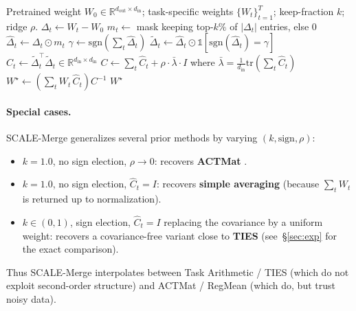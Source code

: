\documentclass{article} %
\begin{document}
\begin{algorithm}[t]
\caption{SCALE-Merge (per linear weight)}
\label{alg:scale}
\begin{algorithmic}[1]
\Require Pretrained weight $W_0 \in \mathbb{R}^{d_\text{out}\times d_\text{in}}$; task-specific weights $\{W_t\}_{t=1}^T$; keep-fraction $k$; ridge $\rho$.
  \State $\Delta_t \gets W_t - W_0$ 
  \State $m_t \gets$ mask keeping top-$k\%$ of $|\Delta_t|$ entries, else $0$ 
  \State $\hat\Delta_t \gets \Delta_t \odot m_t$
\EndFor
\State $\gamma \gets \mathrm{sgn}\!\left(\sum_t \hat\Delta_t\right)$ 
  \State $\tilde\Delta_t \gets \hat\Delta_t \odot \mathbb{1}[\mathrm{sgn}(\hat\Delta_t) = \gamma]$ 
  \State $\hat C_t \gets \tilde\Delta_t^\top \tilde\Delta_t \in \mathbb{R}^{d_\text{in}\times d_\text{in}}$ 
\EndFor
\State $C \gets \sum_t \hat C_t + \rho\cdot \bar\lambda\cdot I$ where $\bar\lambda = \tfrac{1}{d_\text{in}}\mathrm{tr}(\sum_t \hat C_t)$
\State $W^\star \gets \left(\sum_t W_t\, \hat C_t\right) C^{-1}$ 
\State \Return $W^\star$
\end{algorithmic}
\end{algorithm}

\paragraph{Special cases.} SCALE-Merge generalizes several prior methods by varying $(k, \text{sign}, \rho)$:
\begin{itemize}[leftmargin=1.5em]
\item $k=1.0$, no sign election, $\rho\to0$: recovers \textbf{ACTMat} \citep{hameed2025actmat}.
\item $k=1.0$, no sign election, $\hat C_t = I$: recovers \textbf{simple averaging} (because $\sum_t W_t$ is returned up to normalization).
\item $k \in (0,1)$, sign election, $\hat C_t = I$ replacing the covariance by a uniform weight: recovers a covariance-free variant close to \textbf{TIES} (see~\S\ref{sec:exp} for the exact comparison).
\end{itemize}
Thus SCALE-Merge interpolates between Task Arithmetic / TIES (which do not exploit second-order structure) and ACTMat / RegMean (which do, but trust noisy data).
\end{document}
